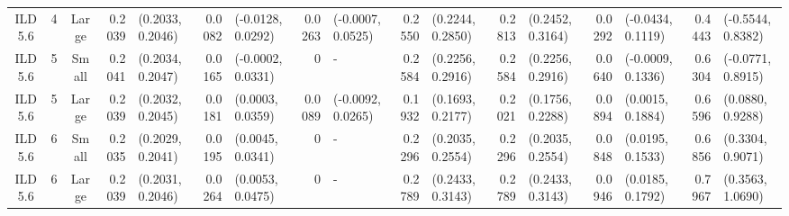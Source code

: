 \begin{landscape}
\begin{table}
\begin{tabular}{cccrlrlrlrlrlrlrl}
ILD5.6	&	4	&	Large	&	0.2039	&	(0.2033, 0.2046)	&	0.0082	&	(-0.0128, 0.0292)	&	0.0263	&	(-0.0007, 0.0525)	&	0.2550	&	(0.2244, 0.2850)	&	0.2813	&	(0.2452, 0.3164)	&	0.0292	&	(-0.0434, 0.1119)	&	0.4443	&	(-0.5544, 0.8382)	\\
ILD5.6	&	5	&	Small	&	0.2041	&	(0.2034, 0.2047)	&	0.0165	&	(-0.0002, 0.0331)	&	0	&	-	&	0.2584	&	(0.2256, 0.2916)	&	0.2584	&	(0.2256, 0.2916)	&	0.0640	&	(-0.0009, 0.1336)	&	0.6304	&	(-0.0771, 0.8915)	\\
ILD5.6	&	5	&	Large	&	0.2039	&	(0.2032, 0.2045)	&	0.0181	&	(0.0003, 0.0359)	&	0.0089	&	(-0.0092, 0.0265)	&	0.1932	&	(0.1693, 0.2177)	&	0.2021	&	(0.1756, 0.2288)	&	0.0894	&	(0.0015, 0.1884)	&	0.6596	&	(0.0880, 0.9288)	\\
ILD5.6	&	6	&	Small	&	0.2035	&	(0.2029, 0.2041)	&	0.0195	&	(0.0045, 0.0341)	&	0	&	-	&	0.2296	&	(0.2035, 0.2554)	&	0.2296	&	(0.2035, 0.2554)	&	0.0848	&	(0.0195, 0.1533)	&	0.6856	&	(0.3304, 0.9071)	\\
ILD5.6	&	6	&	Large	&	0.2039	&	(0.2031, 0.2046)	&	0.0264	&	(0.0053, 0.0475)	&	0	&	-	&	0.2789	&	(0.2433, 0.3143)	&	0.2789	&	(0.2433, 0.3143)	&	0.0946	&	(0.0185, 0.1792)	&	0.7967	&	(0.3563, 1.0690)	\\
        \bottomrule
    \end{tabular}
    \end{table}
\end{landscape}